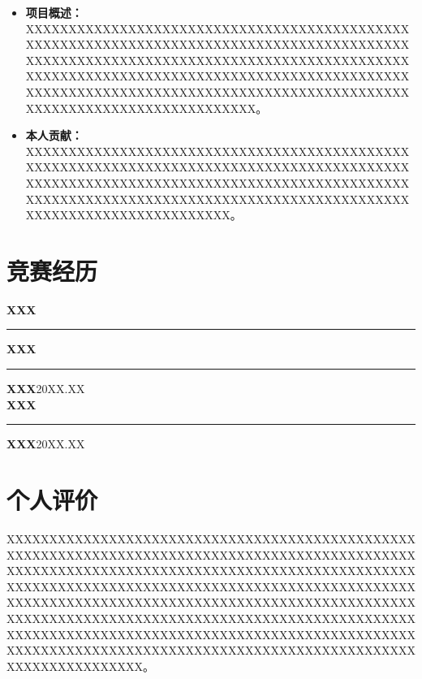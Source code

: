 \documentclass{resume}
\newcommand{\cvsep}{%
	\hspace{0.55em}%
	{\normalfont\rule[0em]{0.40pt}{0.88em}}%
	\hspace{0.55em}%
}
\begin{document}
\datedsubsection{\textbf{XXXX}\cvsep\textbf{XXX}}{20XX.X}
\begin{itemize}[parsep=0.2ex]
	\item \textbf{项目概述：} XXXXXXXXXXXXXXXXXXXXXXXXXXXXXXXXXXXXXXXXXXXXXXXXXXXXXXXXXXXXXXXXXXXXXXXXXXXXXXXXXXXXXXXXXXXXXXXXXXXXXXXXXXXXXXXXXXXXXXXXXXXXXXXXXXXXXXXXXXXXXXXXXXXXXXXXXXXXXXXXXXXXXXXXXXXXXXXXXXXXXXXXXXXXXXXXXXXXXXXXXXXXXXXXXXXXXXXXXXXXXXXXXXXXXXXXXXXXXXXXXXXXXXXXXXXX。

	\item \textbf{本人贡献：} XXXXXXXXXXXXXXXXXXXXXXXXXXXXXXXXXXXXXXXXXXXXXXXXXXXXXXXXXXXXXXXXXXXXXXXXXXXXXXXXXXXXXXXXXXXXXXXXXXXXXXXXXXXXXXXXXXXXXXXXXXXXXXXXXXXXXXXXXXXXXXXXXXXXXXXXXXXXXXXXXXXXXXXXXXXXXXXXXXXXXXXXXXXXXXXXXXXXXXXXXXXX。
\end{itemize}

\section{竞赛经历}
\vspace{-0.3em}
\noindent\textbf{XXX}\cvsep \textbf{XXX}\cvsep \textbf{XXX}\hfill 20XX.XX\\[0.2em]
\noindent\textbf{XXX}\cvsep \textbf{XXX}\hfill 20XX.XX

\section{个人评价}
\noindent
XXXXXXXXXXXXXXXXXXXXXXXXXXXXXXXXXXXXXXXXXXXXXXXXXXXXXXXXXXXXXXXXXXXXXXXXXXXXXXXXXXXXXXXXXXXXXXXXXXXXXXXXXXXXXXXXXXXXXXXXXXXXXXXXXXXXXXXXXXXXXXXXXXXXXXXXXXXXXXXXXXXXXXXXXXXXXXXXXXXXXXXXXXXXXXXXXXXXXXXXXXXXXXXXXXXXXXXXXXXXXXXXXXXXXXXXXXXXXXXXXXXXXXXXXXXXXXXXXXXXXXXXXXXXXXXXXXXXXXXXXXXXXXXXXXXXXXXXXXXXXXXXXXXXXXXXXXXXXXXXXXXXXXXXXXXXXXXXXXXXXXXXXXXXXXXXXXXXXXXXXXXXXXXXXXXXXXXXXXXXXXXXXXXXXXXXXXXXXXXX。
\end{document}
